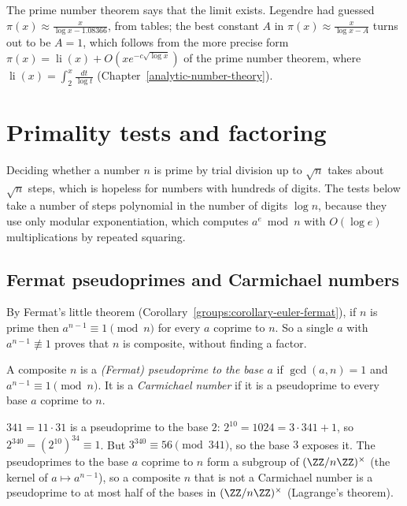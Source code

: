 The prime number theorem says that the limit exists. Legendre had guessed $\pi(x) \approx \frac{x}{\log x - 1.08366}$, from tables; the best constant $A$ in $\pi(x) \approx \frac{x}{\log x - A}$ turns
out to be $A = 1$, which follows from the more precise form $\pi(x) = \operatorname{li}(x) + O(xe^{-c\sqrt{\log x}})$ of the prime number theorem, where
$\operatorname{li}(x) = \int_2^x\frac{dt}{\log t}$ (Chapter~\ref{analytic-number-theory}).

\section{Primality tests and factoring}\label{prime-numbers:section-primality}

Deciding whether a number $n$ is prime by trial division up to $\sqrt{n}$ takes about $\sqrt{n}$ steps, which is hopeless for numbers with hundreds of digits. The tests below take a number of steps
polynomial in the number of digits $\log n$, because they use only modular exponentiation, which computes $a^e \bmod n$ with $O(\log e)$ multiplications by repeated squaring.

\subsection{Fermat pseudoprimes and Carmichael numbers}\label{prime-numbers:subsection-carmichael}

By Fermat's little theorem (Corollary~\ref{groups:corollary-euler-fermat}), if $n$ is prime then $a^{n-1} \equiv 1 \pmod n$ for every $a$ coprime to $n$. So a single $a$ with
$a^{n-1} \not\equiv 1$ proves that $n$ is composite, without finding a factor.

\begin{definition}\label{prime-numbers:definition-pseudoprime}
A composite $n$ is a \emph{(Fermat) pseudoprime to the base $a$} if $\gcd(a, n) = 1$ and $a^{n-1} \equiv 1 \pmod n$. It is a \emph{Carmichael number} if it is a pseudoprime to every base $a$ coprime to
$n$.
\end{definition}

\begin{example}\label{prime-numbers:example-341}
$341 = 11 \cdot 31$ is a pseudoprime to the base $2$: $2^{10} = 1024 = 3 \cdot 341 + 1$, so $2^{340} = (2^{10})^{34} \equiv 1$. But $3^{340} \equiv 56 \pmod{341}$, so the base $3$ exposes it. The pseudoprimes to
the base $a$ coprime to $n$ form a subgroup of $(\ZZ/n\ZZ)^\times$ (the kernel of $a \mapsto a^{n-1}$), so a composite $n$ that is not a Carmichael number is a pseudoprime to at most half of the bases
in $(\ZZ/n\ZZ)^\times$ (Lagrange's theorem).
\end{example}

